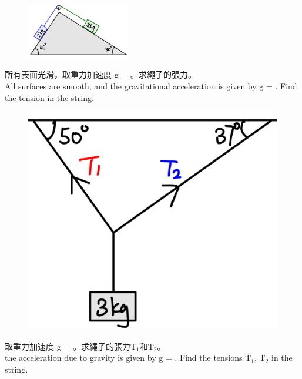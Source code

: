 \documentclass[beamer=true]{standalone}
\begin{document}
\begin{eg}
    \begin{figure}[h!]
        \centering
        \includegraphics[width=0.4\textwidth]{assets/a078f185.png}
    \end{figure}
    所有表面光滑，取重力加速度 g = 。求繩子的張力。\\All surfaces are smooth, and the gravitational acceleration is given by g = . Find the tension in the string.
\end{eg}



\begin{eg}
    \begin{figure}[h!]
        \centering
        \includegraphics[width=.3\textwidth]{assets/ce5681cb.png}
    \end{figure}
    取重力加速度 g = 。求繩子的張力T$_1$和T$_2$。\\the acceleration due to gravity is given by g = . Find the tensions T$_1$, T$_2$ in the string.
\end{eg}
\end{document}
